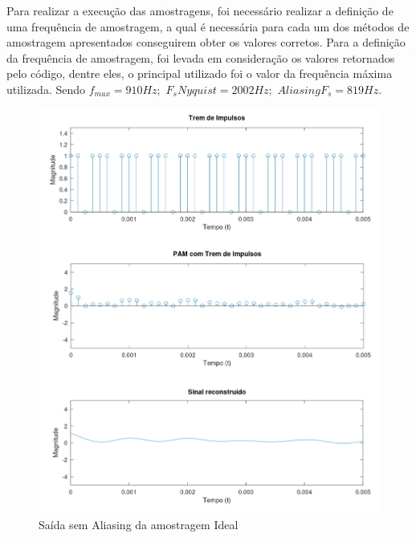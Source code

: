 Para realizar a execução das amostragens, foi necessário realizar a definição de uma frequência de amostragem, a qual é necessária para cada um dos métodos de amostragem apresentados conseguirem obter os valores corretos. Para a definição da frequência de amostragem, foi levada em consideração os valores retornados pelo código, dentre eles, o principal utilizado foi o valor da frequência máxima utilizada. Sendo $f_{max} = 910Hz; $
$F_s Nyquist = 2002Hz;$
$Aliasing F_s = 819Hz.$

\begin{figure}[H]
    \centering
    \includegraphics[width=0.8\linewidth]{03_results/octave_results/ideal_sampling.png}
    \caption{Saída sem Aliasing da amostragem Ideal}
    \label{fig:ideal-pam}
\end{figure}

